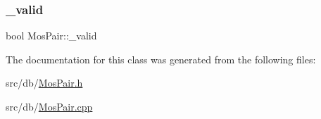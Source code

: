 \subsubsection{\texorpdfstring{\+\_\+valid}{\_valid}}
{\footnotesize\ttfamily bool Mos\+Pair\+::\+\_\+valid\hspace{0.3cm}{\ttfamily [private]}}



The documentation for this class was generated from the following files\+:\begin{DoxyCompactItemize}
\item 
src/db/\hyperlink{MosPair_8h}{Mos\+Pair.\+h}\item 
src/db/\hyperlink{MosPair_8cpp}{Mos\+Pair.\+cpp}\end{DoxyCompactItemize}
